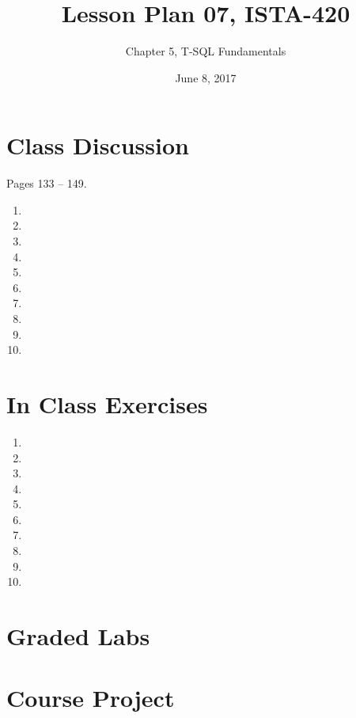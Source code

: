 \documentclass{article}
\title{Lesson Plan 07, ISTA-420}
\author{Chapter 5, T-SQL Fundamentals}
\date{June 8, 2017}
\begin{document}
    

    \maketitle{}

    \section{Class Discussion}

    Pages 133 -- 149.

    \begin{enumerate}
        \item 
        \item 
        \item 
        \item 
        \item 
        \item 
        \item 
        \item 
        \item 
        \item 
    \end{enumerate}

    \section{In Class Exercises}

    \begin{enumerate}
        \item 
        \item 
        \item 
        \item 
        \item 
        \item 
        \item 
        \item 
        \item 
        \item 
    \end{enumerate}

    \section{Graded Labs}



    \section{Course Project}
\end{document}
